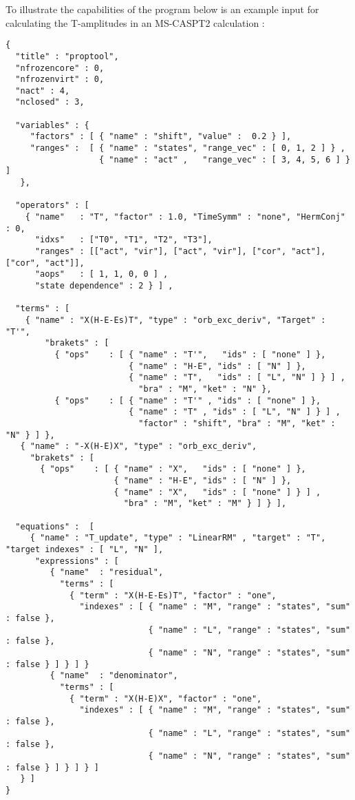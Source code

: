To illustrate the capabilities of the program below is an example input
for calculating the T-amplitudes in an MS-CASPT2 calculation :
\begin{lstlisting}[label={lst:input}]
{
  "title" : "proptool",
  "nfrozencore" : 0,
  "nfrozenvirt" : 0,
  "nact" : 4,
  "nclosed" : 3,

  "variables" : {
     "factors" : [ { "name" : "shift", "value" :  0.2 } ],
     "ranges" :  [ { "name" : "states", "range_vec" : [ 0, 1, 2 ] } ,
                   { "name" : "act" ,   "range_vec" : [ 3, 4, 5, 6 ] } ]
   },

  "operators" : [
    { "name"   : "T", "factor" : 1.0, "TimeSymm" : "none", "HermConj" : 0,
      "idxs"   : ["T0", "T1", "T2", "T3"],
      "ranges" : [["act", "vir"], ["act", "vir"], ["cor", "act"], ["cor", "act"]],
      "aops"   : [ 1, 1, 0, 0 ] ,
      "state dependence" : 2 } ] ,

  "terms" : [
    { "name" : "X(H-E-Es)T", "type" : "orb_exc_deriv", "Target" : "T'",
        "brakets" : [
          { "ops"    : [ { "name" : "T'",   "ids" : [ "none" ] },
                         { "name" : "H-E", "ids" : [ "N" ] },
                         { "name" : "T",   "ids" : [ "L", "N" ] } ] ,
                           "bra" : "M", "ket" : "N" }, 
          { "ops"    : [ { "name" : "T'" , "ids" : [ "none" ] },
                         { "name" : "T" , "ids" : [ "L", "N" ] } ] ,
                           "factor" : "shift", "bra" : "M", "ket" : "N" } ] },
   { "name" : "-X(H-E)X", "type" : "orb_exc_deriv",
     "brakets" : [
       { "ops"    : [ { "name" : "X",   "ids" : [ "none" ] },
                      { "name" : "H-E", "ids" : [ "N" ] },
                      { "name" : "X",   "ids" : [ "none" ] } ] ,
                        "bra" : "M", "ket" : "M" } ] } ],

  "equations" :  [
     { "name" : "T_update", "type" : "LinearRM" , "target" : "T", "target indexes" : [ "L", "N" ],
      "expressions" : [
         { "name"  : "residual",
           "terms" : [
             { "term" : "X(H-E-Es)T", "factor" : "one",
               "indexes" : [ { "name" : "M", "range" : "states", "sum" : false },
                             { "name" : "L", "range" : "states", "sum" : false },
                             { "name" : "N", "range" : "states", "sum" : false } ] } ] }
         { "name"  : "denominator",
           "terms" : [
             { "term" : "X(H-E)X", "factor" : "one",                                                 
               "indexes" : [ { "name" : "M", "range" : "states", "sum" : false },
                             { "name" : "L", "range" : "states", "sum" : false },
                             { "name" : "N", "range" : "states", "sum" : false } ] } ] } ]
   } ]
}                                                 
\end{lstlisting}         

